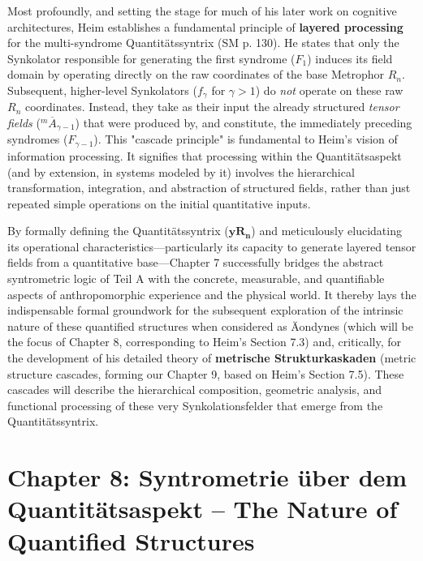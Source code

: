 \documentclass[12pt]{article}
\newcommand{\syndrom}{F}
\newcommand{\quantitaetssyntrix}{\bm{yR_n}}
\begin{document}
Most profoundly, and setting the stage for much of his later work on cognitive architectures, Heim establishes a fundamental principle of \textbf{layered processing} for the multi-syndrome Quantitätssyntrix (SM p. 130). He states that only the Synkolator responsible for generating the first syndrome (\( \syndrom_1 \)) induces its field domain by operating directly on the raw coordinates of the base Metrophor \( R_n \). Subsequent, higher-level Synkolators (\( f_\gamma \) for \( \gamma > 1 \)) do \textit{not} operate on these raw \( R_n \) coordinates. Instead, they take as their input the already structured \textit{tensor fields} (\( ^m\overline{A}_{\gamma-1} \)) that were produced by, and constitute, the immediately preceding syndromes (\( \syndrom_{\gamma-1} \)). This "cascade principle" is fundamental to Heim's vision of information processing. It signifies that processing within the Quantitätsaspekt (and by extension, in systems modeled by it) involves the hierarchical transformation, integration, and abstraction of structured fields, rather than just repeated simple operations on the initial quantitative inputs.

By formally defining the Quantitätssyntrix (\(\quantitaetssyntrix\)) and meticulously elucidating its operational characteristics—particularly its capacity to generate layered tensor fields from a quantitative base—Chapter 7 successfully bridges the abstract syntrometric logic of Teil A with the concrete, measurable, and quantifiable aspects of anthropomorphic experience and the physical world. It thereby lays the indispensable formal groundwork for the subsequent exploration of the intrinsic nature of these quantified structures when considered as Äondynes (which will be the focus of Chapter 8, corresponding to Heim's Section 7.3) and, critically, for the development of his detailed theory of \textbf{metrische Strukturkaskaden} (metric structure cascades, forming our Chapter 9, based on Heim's Section 7.5). These cascades will describe the hierarchical composition, geometric analysis, and functional processing of these very Synkolationsfelder that emerge from the Quantitätssyntrix.

\clearpage 
\section{Chapter 8: Syntrometrie über dem Quantitätsaspekt – The Nature of Quantified Structures}
\label{sec:chapter8}
\end{document}
